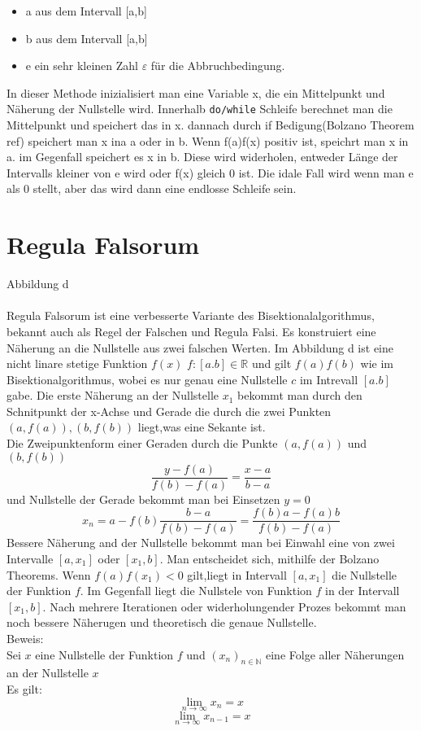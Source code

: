 \begin{itemize}
\item a aus dem Intervall [a,b]
\item b aus dem Intervall [a,b]
\item e ein sehr kleinen Zahl $\varepsilon$ für die Abbruchbedingung.
\end{itemize}
In dieser Methode inizialisiert man eine Variable x, die ein Mittelpunkt und Näherung der Nullstelle wird. Innerhalb \verb|do/while| Schleife berechnet man die Mittelpunkt und speichert das in x. dannach durch if Bedigung(Bolzano Theorem ref) speichert man x ina a oder in b. Wenn f(a)f(x) positiv ist, speichrt man x in a. im Gegenfall speichert es x in b. Diese wird widerholen, entweder Länge der Intervalls kleiner von e wird oder f(x) gleich 0 ist. Die idale Fall wird wenn man e als 0 stellt, aber das wird dann eine endlosse Schleife sein.
\section{Regula Falsorum}
Abbildung d\\
\\
Regula Falsorum ist eine verbesserte Variante des Bisektionalalgorithmus, bekannt auch als Regel der Falschen und Regula Falsi. Es konstruiert eine Näherung an die Nullstelle aus zwei falschen Werten.
Im Abbildung d ist eine nicht linare stetige Funktion $f(x)$ $f: [a.b] \in \mathbb{R}$ und gilt $f(a)f(b)$ wie im Bisektionalgorithmus, wobei es nur genau eine Nullstelle $c$ im Intrevall $[a.b]$ gabe.
Die erste Näherung an der Nullstelle $x_1$ bekommt man durch den Schnitpunkt der x-Achse und Gerade die durch die zwei Punkten$(a,f(a)),(b,f(b))$ liegt,was eine Sekante ist.\\
Die Zweipunktenform einer Geraden durch die Punkte $(a,f(a))$ und $(b,f(b))$
$$\frac{y-f(a)}{f(b)-f(a)}= \frac{x-a}{b-a}$$
und Nullstelle der Gerade bekommt man bei Einsetzen $y=0$
$$x_n = a - f(b)\frac{b - a}{f(b)-  f(a)} = \frac{f(b)a - f(a)b}{f(b) - f(a)}$$
Bessere Näherung and der Nullstelle bekommt man bei Einwahl eine von zwei Intervalle $[a,x_1] $ oder $[x_1, b]$. Man entscheidet sich, mithilfe der Bolzano Theorems. Wenn $f(a)f(x_1) < 0$ gilt,liegt in Intervall $[a,x_1]$ die Nullstelle der Funktion $f$. Im Gegenfall liegt die Nullstele von Funktion $f$ in der Intervall $[x_1,b]$. Nach mehrere Iterationen oder widerholungender Prozes bekommt man noch bessere Näherugen und theoretisch die genaue Nullstelle.\\
Beweis:\\
Sei $x$ eine Nullstelle der Funktion $f$ und $(x_n)_{n \in \mathbb{N}}$ eine Folge aller Näherungen an der Nullstelle $x$\\
Es gilt: 
$$ \lim_{n \to \infty}x_n = x$$
$$ \lim_{n \to \infty}x_{n-1} = x$$

